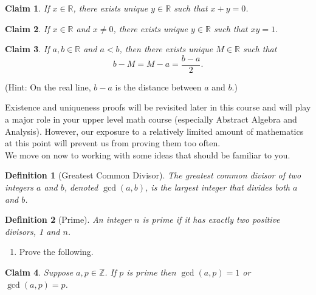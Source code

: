 \documentclass[12 pt]{article}
\newcommand{\R}{\mathbb{R}}
\newcommand{\Z}{\mathbb{Z}}
\theoremstyle{definition}
\theoremstyle{plain}
\theoremstyle{mytheorem}
\theoremstyle{myexample}
\newtheorem{claim}{Claim}
\theoremstyle{mydefinition}
\newtheorem*{definition*}{Definition}
\begin{document}
\newpage
\begin{claim}  If $x \in \R$, there exists unique $y \in \R$ such that $x+y=0$.
\end{claim}

\vspace{4in}

\begin{claim}  If $x \in \R$ and $x \neq 0$, there exists unique $y \in \R$ such that $xy=1$.
\end{claim}

\newpage

\begin{claim}  If $a,b \in \R$ and $a<b$, then there exists unique $M \in \R$ such that
\[b-M=M-a = \frac{b-a}{2}.\]
\end{claim}
\noindent (Hint: On the real line, $b-a$ is the distance between $a$ and $b$.)

\vspace{5in}

\noindent  Existence and uniqueness proofs will be revisited later in this course and will play a major role in your upper level math course (especially Abstract Algebra and Analysis).  However, our exposure to a relatively limited amount of mathematics at this point will prevent us from proving them too often.\\

\noindent We move on now to working with some ideas that should be familiar to you.  

\begin{definition*}[Greatest Common Divisor]  The \textit{greatest common divisor} of two integers $a$ and $b$, denoted $\gcd(a,b)$, is the largest integer that divides both $a$ and $b$.
\end{definition*}

\begin{definition*}[Prime]  An integer $n$ is \textit{prime} if it has exactly two positive divisors, 1 and $n$.
\end{definition*}

\begin{enumerate}[resume]
\item Prove the following.
\end{enumerate}
\begin{claim} Suppose $a,p \in \Z$.  If $p$ is prime then $\gcd(a,p)=1$ or $\gcd(a,p)=p$.
\end{claim}


\vspace{4in}
\end{document}
